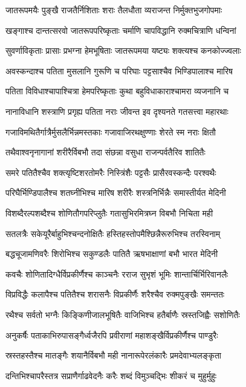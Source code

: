 \twolineshloka
{जातरूपमयैः पुङ्खै राजतैर्निशिताः शराः}
{तैलधौता व्यराजन्त निर्मुक्तभुजगोपमाः}


\twolineshloka
{खङ्गाश्च दान्तत्सरवो जातरूपपरिष्कृताः}
{चर्माणि चापविद्धानि रुक्मचित्राणि धन्विनां}


\twolineshloka
{सुवर्णाविकृताः प्रासाः प्रभग्ना हेमभूषिताः}
{जातरूपमया यष्ट्यः शक्त्यश्च कनकोज्ज्वलाः}


\twolineshloka
{अवस्कन्दाश्च पतिता मुसलानि गुरूणि च}
{परिघाः पट्टसाश्चैव भिण्डिपालाश्च मारिष}


\twolineshloka
{पतिता विविधाश्चापाश्चित्रा हेमपरिष्कृताः}
{कुथा बहुविधाकाराश्चामरा व्यजनानि च}


\twolineshloka
{नानाविधानि शस्त्राणि प्रगृह्य पतिता नराः}
{जीवन्त इव दृश्यनते गतसत्त्वा महारथाः}


\twolineshloka
{गजाविमथितैर्गात्रैर्मुसलैर्भिन्नमस्तकाः}
{गजावाजिरथक्षुण्णाः शेरते स्म नराः क्षितौ}


\twolineshloka
{तथैवाश्वनृनागानां शरीरैर्विबभौ तदा}
{संछन्ना वसुधा राजन्पर्वतैरिव शातितैः}


\twolineshloka
{समरे पतितैश्चैव शक्त्यृष्टिशरतोमरैः}
{निस्त्रिंशैः पट्टसैः प्रासैरवस्कन्दैः परश्वथैः}


\twolineshloka
{परिघैर्भिण्डिपालैश्च शतघ्नीभिश्च मारिष}
{शरीरैः शस्त्रनिर्भिन्नैः समास्तीर्यत मेदिनी}


\twolineshloka
{विशब्दैरल्पशब्दैश्च शोणितौगपरिप्लुतैः}
{गतासुभिरमित्रघ्न विबभौ निचिता मही}


\twolineshloka
{सतलत्रैः सकेयूरैर्बाहुभिश्चन्दनोक्षितैः}
{हस्तिहस्तोपमैश्छिन्नैरूरुभिश्च तरस्विनाम्}


\twolineshloka
{बद्धचूजामणिवरैः शिरोभिश्च सकुण्डलैः}
{पातितै ऋषभाक्षाणां बभौ भारत मेदिनी}


\twolineshloka
{कवचैः शोणितादिग्धैर्विप्रकीर्णैश्च काञ्चनैः}
{रराज सुभृशं भूमिः शान्तार्चिर्भिरिवानलैः}


\twolineshloka
{विप्रविद्धैः कलापैश्च पतितैश्च शरासनैः}
{विप्रकीर्णैः शरैश्चैव रुक्मपुङ्खैः समन्ततः}


\twolineshloka
{रथैश्च सर्वतो भग्नैः किङ्किणीजालभूषितैः}
{वाजिभिश्च हतैर्बाणैः स्रस्तजिह्वैः सशोणितैः}


\twolineshloka
{अनुकर्षैः पताकाभिरुपासङ्गैर्ध्वजैरपि}
{प्रवीराणां महाशङ्खैर्विप्रकीर्णैश्च पाण्डुरैः}


\twolineshloka
{स्रस्तहस्तैश्च मातङ्गैः शयानैर्विबभौ मही}
{नानारूपेरलंकारैः प्रमदेवाभ्यलङ्कृता}


\twolineshloka
{दन्तिभिश्चापरैस्तत्र सप्राणैर्गाढवेदनैः}
{करैः शब्दं विमुञ्चद्भिः शीकरं च मुहुर्मुहुः}


